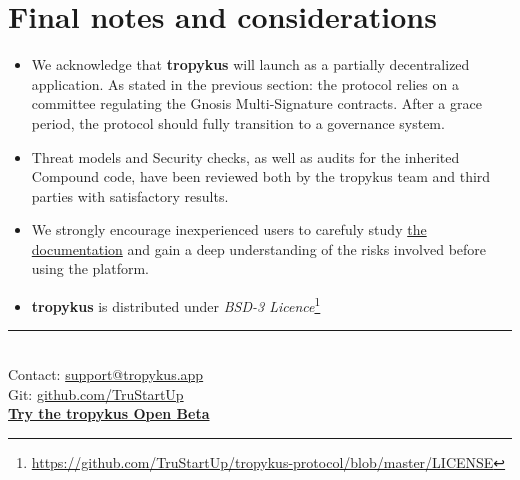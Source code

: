 \documentclass{article}
\begin{document}
\section{Final notes and considerations}

\begin{itemize}
\item We acknowledge that \textbf{tropykus} will launch as a partially decentralized application. As stated in the previous section: the protocol relies on a committee regulating the Gnosis Multi-Signature contracts. After a grace period, the protocol should fully transition to a governance system.
\item Threat models and Security checks, as well as audits for the inherited Compound code, have been reviewed both by the tropykus team and third parties with satisfactory results.
\item We strongly encourage inexperienced users to carefuly study \href{https://test.tropykus.app/doc}{the documentation} and gain a deep understanding of the risks involved before using the platform.
\item \textbf{tropykus} is distributed under \textit{BSD-3 Licence}\footnote{\href{https://github.com/TruStartUp/tropykus-protocol/blob/master/LICENSE}{https://github.com/TruStartUp/tropykus-protocol/blob/master/LICENSE}}
\\[0.1in]
\end{itemize}
\begin{center}
\noindent\rule{8cm}{0.4pt}
\\[0.5in]
Contact: \href{mailto:support@tropykus.app}{support@tropykus.app}\\
Git: \href{https://github.com/TruStartUp/tropykus-protocol}{github.com/TruStartUp}\\[0.1in]
\textbf{\href{https://test.tropykus.app}{Try the tropykus Open Beta}}

\end{center}


\end{document}
